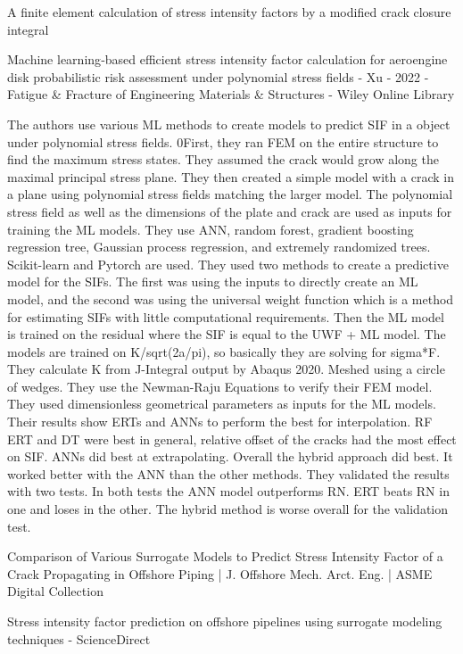
A finite element calculation of stress intensity factors by a modified crack closure integral

Machine learning‐based efficient stress intensity factor calculation for aeroengine disk probabilistic risk assessment under polynomial stress fields - Xu - 2022 - Fatigue & Fracture of Engineering Materials & Structures - Wiley Online Library


The authors use various ML methods to create models to predict SIF in a object under polynomial stress fields. 0First, they ran FEM on the entire structure to find the maximum stress states. They assumed the crack would grow along the maximal principal stress plane. They then created a simple model with a crack in a plane using polynomial stress fields matching the larger model. The polynomial stress field as well as the dimensions of the plate and crack are used as inputs for training the ML models. They use ANN, random forest, gradient boosting regression tree, Gaussian process regression, and extremely randomized trees. Scikit-learn and Pytorch are used. 
They used two methods to create a predictive model for the SIFs. The first was using the inputs to directly create an ML model, and the second was using the universal weight function which is a method for estimating SIFs with little computational requirements. Then the ML model is trained on the residual where the SIF is equal to the UWF + ML model. The models are trained on K/sqrt(2a/pi), so basically they are solving for sigma*F. They calculate K from J-Integral output by Abaqus 2020. Meshed using a circle of wedges. They use the Newman-Raju Equations to verify their FEM model. They used dimensionless geometrical parameters as inputs for the ML models.
Their results show ERTs and ANNs to perform the best for interpolation. RF ERT and DT were best in general, relative offset of the cracks had the most effect on SIF. ANNs did best at extrapolating. Overall the hybrid approach did best. It worked better with the ANN than the other methods. They validated the results with two tests. In both tests the ANN model outperforms RN. ERT beats RN in one and loses in the other. The hybrid method is worse overall for the validation test. 


Comparison of Various Surrogate Models to Predict Stress Intensity Factor of a Crack Propagating in Offshore Piping | J. Offshore Mech. Arct. Eng. | ASME Digital Collection

Stress intensity factor prediction on offshore pipelines using surrogate modeling techniques - ScienceDirect

